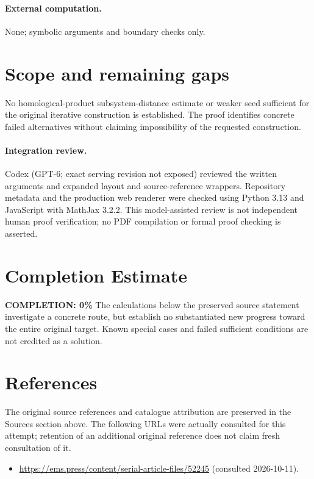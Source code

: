 \documentclass[11pt]{article}
\begin{document}
\paragraph{External computation.} None; symbolic arguments and boundary checks only.
\section{Scope and remaining gaps}
No homological-product subsystem-distance estimate or weaker seed sufficient for the original iterative construction is established. The proof identifies concrete failed alternatives without claiming impossibility of the requested construction.
\paragraph{Integration review.} Codex (GPT-6; exact serving revision not exposed) reviewed the written arguments and expanded layout and source-reference wrappers. Repository metadata and the production web renderer were checked using Python 3.13 and JavaScript with MathJax 3.2.2. This model-assisted review is not independent human proof verification; no PDF compilation or formal proof checking is asserted.

\section{Completion Estimate}
\noindent\textbf{COMPLETION: 0\%}
The calculations below the preserved source statement investigate a concrete route,
but establish no substantiated new progress toward the entire original target.
Known special cases and failed sufficient conditions are not credited as a solution.
\section{References}
The original source references and catalogue attribution are preserved in the
Sources section above. The following URLs were actually consulted for this attempt;
retention of an additional original reference does not claim fresh consultation of it.
\begin{itemize}
\item \url{https://ems.press/content/serial-article-files/52245} (consulted 2026-10-11). 
\end{itemize}
\end{document}
